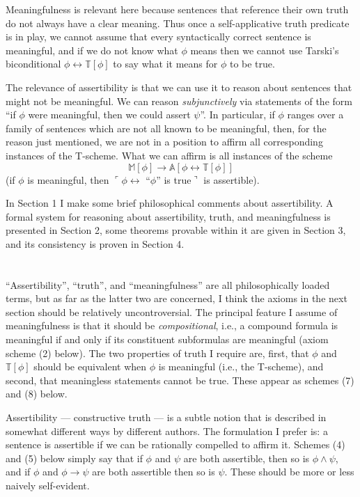 \documentclass{amsart}
\theoremstyle{definition}
\begin{document}
Meaningfulness is relevant here because sentences that reference their own truth do not always have a clear meaning. Thus once a self-applicative truth predicate is in play, we cannot assume that every syntactically correct sentence is meaningful, and if we do not know what $\phi$ means then we cannot use Tarski's biconditional $\phi \leftrightarrow \mathbb{T}[\phi]$ to say what it means for $\phi$ to be true.

The relevance of assertibility is that we can use it to reason about sentences that might not be meaningful. We can reason {\it subjunctively} via statements of the form ``if $\phi$ were meaningful, then we could assert $\psi$''. In particular, if $\phi$ ranges over a family of sentences which are not all known to be meaningful, then, for the reason just mentioned, we are not in a position to affirm all corresponding instances of the T-scheme. What we can affirm is all instances of the scheme $$\mathbb{M}[\phi] \to \mathbb{A}[\phi \leftrightarrow \mathbb{T}[\phi]]$$ (if $\phi$ is meaningful, then $\ulcorner \phi \leftrightarrow$ ``$\phi$'' is true$\urcorner$ is assertible).

In Section 1 I make some brief philosophical comments about assertibility. A formal system for reasoning about assertibility, truth, and meaningfulness is presented in Section 2, some theorems provable within it are given in Section 3, and its consistency is proven in Section 4.

\section{}

``Assertibility'', ``truth'', and ``meaningfulness'' are all philosophically loaded terms, but as far as the latter two are concerned, I think the axioms in the next section should be relatively uncontroversial. The principal feature I assume of meaningfulness is that it should be {\it compositional}, i.e., a compound formula is meaningful if and only if its constituent subformulas are meaningful (axiom scheme (2) below). The two properties of truth I require are, first, that $\phi$ and $\mathbb{T}[\phi]$ should be equivalent when $\phi$ is meaningful (i.e., the T-scheme), and second, that meaningless statements cannot be true. These appear as schemes (7) and (8) below.

Assertibility --- constructive truth --- is a subtle notion that is described in somewhat different ways by different authors. The formulation I prefer is: a sentence is assertible if we can be rationally compelled to affirm it. Schemes (4) and (5) below simply say that if $\phi$ and $\psi$ are both assertible, then so is $\phi \wedge \psi$, and if $\phi$ and $\phi \to \psi$ are both assertible then so is $\psi$. These should be more or less naively self-evident.
\end{document}
